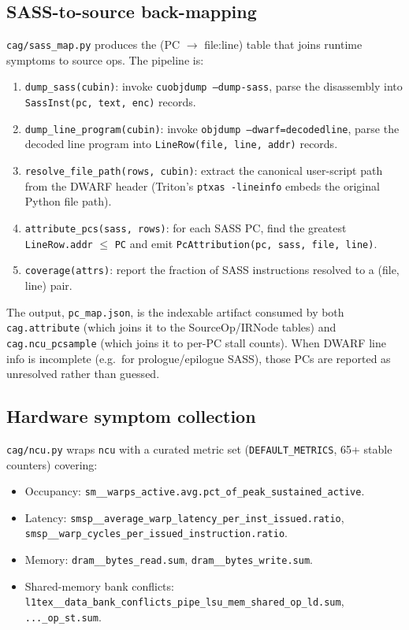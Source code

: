 \documentclass[10pt]{article}
\begin{document}
\subsection{SASS-to-source back-mapping}\label{sec:sassmap}

\texttt{cag/sass\_map.py} produces the (PC $\to$ file:line) table that joins runtime symptoms to source ops. The pipeline is:
\begin{enumerate}[leftmargin=*,itemsep=0.1em,topsep=0.2em]
  \item \texttt{dump\_sass(cubin)}: invoke \texttt{cuobjdump --dump-sass}, parse the disassembly into \texttt{SassInst(pc, text, enc)} records.
  \item \texttt{dump\_line\_program(cubin)}: invoke \texttt{objdump --dwarf=decodedline}, parse the decoded line program into \texttt{LineRow(file, line, addr)} records.
  \item \texttt{resolve\_file\_path(rows, cubin)}: extract the canonical user-script path from the DWARF header (Triton's \texttt{ptxas -lineinfo} embeds the original Python file path).
  \item \texttt{attribute\_pcs(sass, rows)}: for each SASS PC, find the greatest \texttt{LineRow.addr} $\leq$ \texttt{PC} and emit \texttt{PcAttribution(pc, sass, file, line)}.
  \item \texttt{coverage(attrs)}: report the fraction of SASS instructions resolved to a (file, line) pair.
\end{enumerate}

The output, \texttt{pc\_map.json}, is the indexable artifact consumed by both \texttt{cag.attribute} (which joins it to the SourceOp/IRNode tables) and \texttt{cag.ncu\_pcsample} (which joins it to per-PC stall counts). When DWARF line info is incomplete (e.g.~for prologue/epilogue SASS), those PCs are reported as unresolved rather than guessed.

\subsection{Hardware symptom collection}\label{sec:ncu}

\texttt{cag/ncu.py} wraps \texttt{ncu} with a curated metric set (\texttt{DEFAULT\_METRICS}, 65+ stable counters) covering:
\begin{itemize}[leftmargin=*,itemsep=0.1em,topsep=0.2em]
  \item Occupancy: \texttt{sm\_\_warps\_active.avg.pct\_of\_peak\_sustained\_active}.
  \item Latency: \texttt{smsp\_\_average\_warp\_latency\_per\_inst\_issued.ratio}, \texttt{smsp\_\_warp\_cycles\_per\_issued\_instruction.ratio}.
  \item Memory: \texttt{dram\_\_bytes\_read.sum}, \texttt{dram\_\_bytes\_write.sum}.
  \item Shared-memory bank conflicts: \texttt{l1tex\_\_data\_bank\_conflicts\_pipe\_lsu\_mem\_shared\_op\_ld.sum}, \texttt{...\_op\_st.sum}.
\end{itemize}
\end{document}
